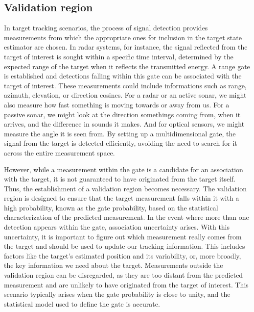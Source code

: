 \subsection{Validation region}
\label{sec:validation_region}
In target tracking scenarios, the process of signal detection provides measurements from which the appropriate ones
for inclusion in the target state estimator are chosen. In radar systems, for instance, the signal reflected from the
target of interest is sought within \linebreak a specific time interval, determined by the expected range of the target when it
reflects the transmitted energy. A range gate is established and detections falling within this gate can be
associated with the target of interest. These measurements could include informations such as range, azimuth, elevation,
or direction cosines. For a radar or \linebreak an active sonar, we might also measure how fast something is moving towards or away
from us. For a passive sonar, we might look at the direction somethings coming from, when it arrives, and the
difference in sounds it makes. And for optical sensors, we might measure the angle it is seen from. By setting up a
multidimensional gate, the signal from the target is detected efficiently, avoiding the need to search for it across the entire measurement space.

However, while a measurement within the gate is a candidate for an association with the target, it is not guaranteed to
have originated from the target itself. Thus, the establishment of a validation region becomes necessary. The
validation region is designed to ensure that the target measurement falls within it with a high probability, known as
the gate probability, based on the statistical characterization of the predicted measurement. In the event where more
than one detection appears within the gate, association uncertainty arises. With this uncertainty, it is important to
figure out which measurement really comes from the target and should be used to update our tracking information. This includes factors like the target's estimated position and its variability, or, more broadly, the key information we need about the target. Measurements outside the validation region can be disregarded, as they are too distant from the predicted measurement and are unlikely to have originated from the target of interest. This scenario typically arises when the gate probability is close to unity, and the statistical model used to define the gate is accurate.

